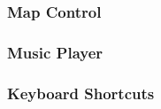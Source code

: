 \subsubsection{Map Control}

\subsubsection{Music Player}

\subsubsection{\label{shortcuts}Keyboard Shortcuts}

